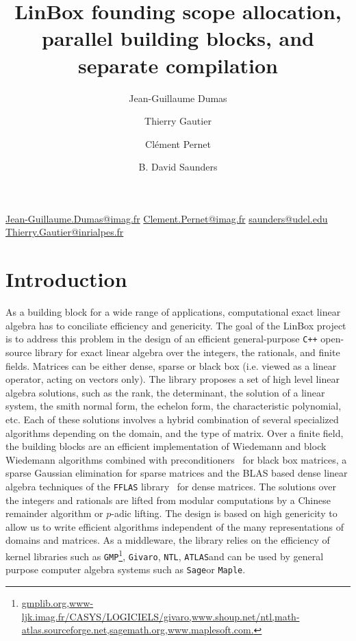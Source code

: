\documentclass[runningheads,a4paper]{llncs}
\newcommand{\linbox}{{\sc LinBox}\xspace}
\begin{document}
\mainmatter  
\title{\linbox founding scope allocation, parallel building blocks, and
  separate compilation}
\titlerunning{\linbox memory, parallelism, compilation models}

\urldef\jgdemail\url{Jean-Guillaume.Dumas@imag.fr}
\urldef\cpemail\url{Clement.Pernet@imag.fr}
\urldef\bdsemail\url{saunders@udel.edu}
\urldef\tgemail\url{Thierry.Gautier@inrialpes.fr}

\author{
Jean-Guillaume Dumas
\and Thierry Gautier
\and Cl\'ement Pernet
\and B. David Saunders
}
\maketitle
\section{Introduction}
As a building block for a wide range of applications, computational exact linear
algebra has to conciliate efficiency and genericity. The goal of the 
\linbox project is to address this problem in the design of an efficient general-purpose
\texttt{C++} open-source library for exact linear algebra over the integers, the
rationals, and finite fields. 
Matrices can be either dense, sparse or black box (i.e. viewed as a linear
operator, acting on vectors only). The library proposes a set of high level
linear algebra solutions, such as the rank, the determinant, the solution of a
linear system, the smith normal form, the echelon form, the characteristic
polynomial, etc. Each of these solutions involves a hybrid combination of several specialized
algorithms depending on the domain, and the type of matrix. Over a finite field,
the building blocks are an efficient implementation of Wiedemann and block
Wiedemann algorithms combined with preconditioners~\cite{CEKSTV:2002:EP} for
black box matrices, a sparse Gaussian elimination for sparse matrices and the
BLAS based dense linear algebra techniques of the \texttt{FFLAS}
library~\cite{DGP:2008:dlaff} for dense matrices. The solutions over the integers
and rationals are lifted from modular computations by a Chinese remainder
algorithm or $p$-adic lifting.
The design is based on high genericity to allow us to write efficient algorithms independent of the many 
representations of domains and matrices. As a middleware, the library relies on the
efficiency of kernel libraries such as  \texttt{GMP}\footnote{\url{gmplib.org,www-ljk.imag.fr/CASYS/LOGICIELS/givaro,www.shoup.net/ntl,math-atlas.sourceforge.net,sagemath.org,www.maplesoft.com.}},
\texttt{Givaro}\footnotemark[4],
\texttt{NTL}\footnotemark[4],
\texttt{ATLAS}\footnotemark[4] and can be used by general
purpose computer algebra systems such as \texttt{Sage}\footnotemark[4] or \texttt{Maple}\footnotemark[4].
\end{document}
